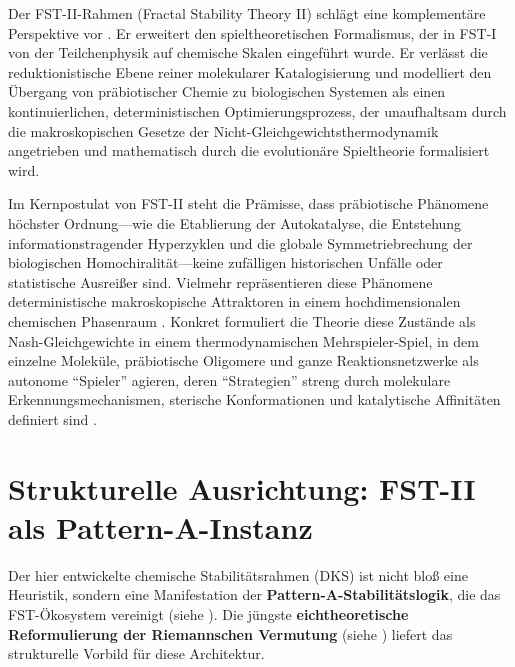 \documentclass[12pt,a4paper]{article}
\theoremstyle{remark}
\begin{document}
Der FST-II-Rahmen (Fractal Stability Theory II) schl\"agt eine komplement\"are Perspektive vor \citep{England2013}. Er erweitert den spieltheoretischen Formalismus, der in FST-I \citep{FSTI} von der Teilchenphysik auf chemische Skalen eingef\"uhrt wurde. Er verl\"asst die reduktionistische Ebene reiner molekularer Katalogisierung und modelliert den \"Ubergang von pr\"abiotischer Chemie zu biologischen Systemen als einen kontinuierlichen, deterministischen Optimierungsprozess, der unaufhaltsam durch die makroskopischen Gesetze der Nicht-Gleichgewichtsthermodynamik angetrieben und mathematisch durch die evolution\"are Spieltheorie formalisiert wird.

Im Kernpostulat von FST-II steht die Pr\"amisse, dass pr\"abiotische Ph\"anomene h\"ochster Ordnung---wie die Etablierung der Autokatalyse, die Entstehung informationstragender Hyperzyklen \citep{Eigen1979} und die globale Symmetriebrechung der biologischen Homochiralit\"at---keine zuf\"alligen historischen Unf\"alle oder statistische Ausrei\ss{}er sind. Vielmehr repr\"asentieren diese Ph\"anomene deterministische makroskopische Attraktoren in einem hochdimensionalen chemischen Phasenraum \citep{ReplicatorEntropy}. Konkret formuliert die Theorie diese Zust\"ande als Nash-Gleichgewichte in einem thermodynamischen Mehrspieler-Spiel, in dem einzelne Molek\"ule, pr\"abiotische Oligomere und ganze Reaktionsnetzwerke als autonome ``Spieler'' agieren, deren ``Strategien'' streng durch molekulare Erkennungsmechanismen, sterische Konformationen und katalytische Affinit\"aten definiert sind \citep{CGT2018,CGTMacmillan}.

\section{Strukturelle Ausrichtung: FST-II als Pattern-A-Instanz}
\label{sec:structural-alignment}

Der hier entwickelte chemische Stabilit\"atsrahmen (DKS) ist nicht blo\ss{} eine Heuristik, sondern eine Manifestation der \textbf{Pattern-A-Stabilit\"atslogik}, die das FST-\"Okosystem vereinigt (siehe \cite{FST-Unified2026}). Die j\"ungste \textbf{eichtheoretische Reformulierung der Riemannschen Vermutung} (siehe \cite{GeigerRH2026c}) liefert das strukturelle Vorbild f\"ur diese Architektur.
\end{document}
